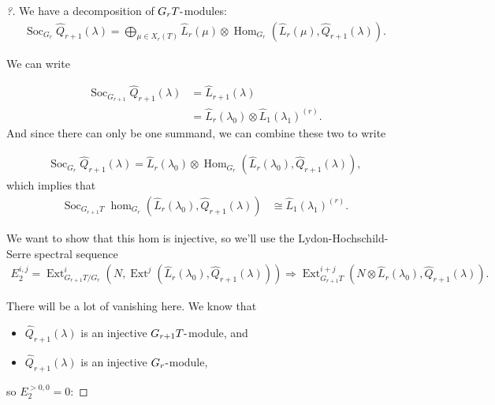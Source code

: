 \begin{proof}[?]

We have a decomposition of \(G_r T{\hbox{-}}\)modules:
\begin{align*}  
\operatorname{Soc}_{G_r} \widehat{Q}_{r+1}(\lambda) = \bigoplus_{\mu\in X_r(T)} \widehat{L}_r(\mu) \otimes{\operatorname{Hom}}_{G_r}(\widehat{L}_r(\mu), \widehat{Q}_{r+1}(\lambda) )
.\end{align*}

We can write

\begin{align*}  
\operatorname{Soc}_{G_{r+1}} \widehat{Q}_{r+1}(\lambda) 
&= \widehat{L}_{r+1}(\lambda) \\
&= \widehat{L}_r(\lambda_0) \otimes\widehat{L}_1(\lambda_1)^{(r)}
.\end{align*}
And since there can only be one summand, we can combine these two to
write

\begin{align*}  
\operatorname{Soc}_{G_r} \widehat{Q}_{r+1}(\lambda) = \widehat{L}_r(\lambda_0) \otimes{\operatorname{Hom}}_{G_r}(\widehat{L}_r(\lambda_0), \widehat{Q}_{r+1}(\lambda) )
,\end{align*}
which implies that
\begin{align*}  
\operatorname{Soc}_{G_{r+1} T} \hom_{G_r}(\widehat{L}_r(\lambda_0), \widehat{Q}_{r+1}(\lambda)  ) &\cong \widehat{L}_1(\lambda_1)^{(r)}
.\end{align*}

We want to show that this hom is injective, so we'll use the
Lydon-Hochschild-Serre spectral sequence
\begin{align*}  
E_2^{i, j} = \operatorname{Ext}_{G_{r+1} T/G_r}^i (N, \operatorname{Ext}^j( \widehat{L}_r(\lambda_0), \widehat{Q}_{r+1}(\lambda) )  )
\Rightarrow
\operatorname{Ext}^{i+j}_{G_{r+1} T} ( N\otimes\widehat{L}_r(\lambda_0), \widehat{Q}_{r+1}(\lambda) )
.\end{align*}

There will be a lot of vanishing here. We know that

\begin{itemize}
\tightlist
\item
  \(\widehat{Q}_{r+1}(\lambda)\) is an injective
  \(G_{r+1}T{\hbox{-}}\)module, and
\item
  \(\widehat{Q}_{r+1}(\lambda)\) is an injective
  \(G_{r}{\hbox{-}}\)module,
\end{itemize}

so \(E_2^{>0, 0} = 0\):


\end{proof}
